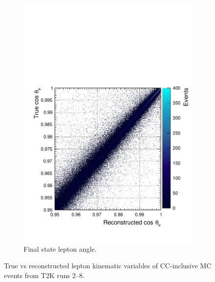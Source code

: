 \begin{figure}
\begin{subfigure}{.5\textwidth}
  \includegraphics[width=0.95\linewidth]{figs/angres2d}
  \caption{Final state lepton angle.}
  \label{fig:angres2d}
\end{subfigure}
\caption{True vs reconstructed lepton kinematic variables of CC-inclusive MC events from T2K runs 2--8.}
\label{fig:res2d}
\end{figure}

